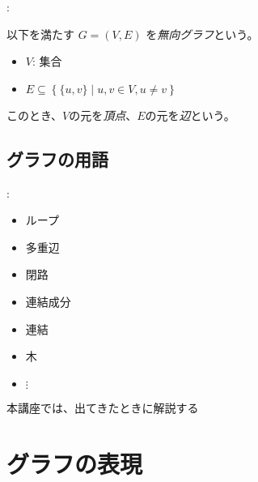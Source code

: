 \documentclass[dvipdfmx]{beamer}
\begin{document}
\begin{frame}{\insertsection: \insertsubsection}
  \begin{definition}
    以下を満たす $G = (V, E)$ を\emph{無向グラフ}という。
    \begin{itemize}
      \item $V$: 集合
      \item $E \subseteq \left\{ \{u, v\} \mid u, v \in V, u \neq v \right\}$
    \end{itemize}
    このとき、$V$の元を\emph{頂点}、$E$の元を\emph{辺}という。
  \end{definition}
\end{frame}

\subsection{グラフの用語}

\begin{frame}{\insertsection: \insertsubsection}
  \begin{block}{\insertsubsection}
    \begin{itemize}
      \item ループ
      \item 多重辺
      \item 閉路
      \item 連結成分
      \item 連結
      \item 木
      \item $\vdots$
    \end{itemize}
    本講座では、出てきたときに解説する
  \end{block}
\end{frame}

\section{グラフの表現}
\end{document}
